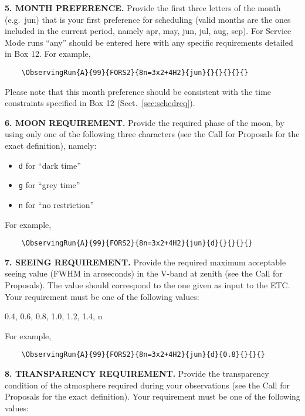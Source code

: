 \documentclass{article}
\begin{document}
\medskip

{\bf 5. MONTH PREFERENCE.} Provide the first three letters of the
month (e.g.\ jun) that is your first preference for
scheduling (valid months are the ones included in the current period,
namely apr, may, jun, jul,
aug, sep).
For Service Mode runs ``any'' should be entered here with any specific 
requirements detailed in Box 12. 
For example,
\begin{verbatim}
    \ObservingRun{A}{99}{FORS2}{8n=3x2+4H2}{jun}{}{}{}{}{}
\end{verbatim}
Please note that this month preference should be consistent with the time
constraints specified in Box 12 (Sect.~\ref{sec:schedreq}).

\medskip

{\bf 6. MOON REQUIREMENT.} Provide the required phase of the moon, by
using only one of the following three characters (see the Call for
Proposals for the exact definition), namely:
\begin{itemize}
\item {\tt d} for ``dark time''
\item {\tt g} for ``grey time''
\item {\tt n} for ``no restriction''
\end{itemize}
For example,
\begin{verbatim}
    \ObservingRun{A}{99}{FORS2}{8n=3x2+4H2}{jun}{d}{}{}{}{}
\end{verbatim}

\medskip

{\bf 7. SEEING REQUIREMENT.} Provide the required maximum acceptable seeing value (FWHM in arcseconds) in the V-band at zenith (see the Call for Proposals). The value should correspond to the one given as input to the ETC.  Your requirement must be one of the following values:

\smallskip

0.4, 0.6, 0.8, 1.0, 1.2, 1.4, n

\smallskip

For example,
\begin{verbatim}
    \ObservingRun{A}{99}{FORS2}{8n=3x2+4H2}{jun}{d}{0.8}{}{}{}
\end{verbatim}

\medskip

{\bf 8. TRANSPARENCY REQUIREMENT.} Provide the transparency
condition of the atmosphere required during your observations (see the
Call for Proposals for the exact definition). Your requirement must
be one of the following values:
\end{document}
